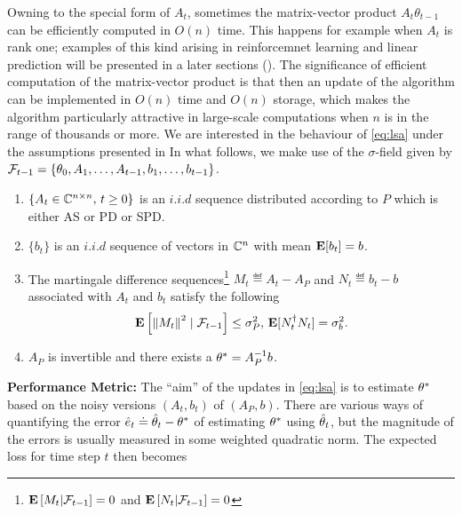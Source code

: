 \documentclass{article}
\begin{document}
Owning to the special form of $A_t$, sometimes the matrix-vector product $A_t \theta_{t-1}$
can be efficiently computed in $O(n)$ time.
This happens for example when $A_t$ is rank one; examples of this kind arising in reinforcemnet learning \cite{} and linear prediction \cite{} will be presented in a later sections (). The significance of efficient computation of the matrix-vector product is that then an update of the algorithm
can be implemented in $O(n)$ time and $O(n)$ storage, which makes the algorithm particularly attractive in large-scale computations when $n$ is in the range of thousands or more.
We are interested in the behaviour of \eqref{eq:lsa} under the assumptions presented in  In what follows, we make use of the $\sigma$-field given by $\mathcal{F}_{t-1}=\{\theta_0,A_1,\ldots, A_{t-1}, b_1,\ldots, b_{t-1}\}$.
\begin{assumption}\label{assmp:lsa}
\begin{enumerate}[leftmargin=*, before = \leavevmode\vspace{-\baselineskip}]
\item \label{dist} $\{A_t\in\mathbb{C}^{n\times n},\, t\geq 0\}$ is an $i.i.d$ sequence distributed according to $P$ which is either AS or PD or SPD.
\item $\{b_t\}$ is an $i.i.d$ sequence of vectors in $\mathbb{C}^n$ with mean $\mathbf{E}[b_t]=b$.
\item \label{matvar} The martingale difference sequences\footnote{$\mathbf{E}\left[M_t|\mathcal{F}_{t-1}\right]=0$ and $\mathbf{E}\left[N_t|\mathcal{F}_{t-1}\right]=0$} $M_t\eqdef A_t-A_P$ and $N_t\eqdef b_t-b$ associated with $A_t$ and $b_t$ satisfy the following
\begin{align*}\mathbf{E}\left[ \left\| M_t\right\|^2\mid\mathcal{F}_{t-1}\right]\leq \sigma^2_P, \, \mathbf{E}[N_t^\dag N_t]=\sigma_b^2.\end{align*}
\item $A_P$ is invertible and there exists a $\theta^*=A_P^{-1}b$.
\end{enumerate}
\end{assumption}
\textbf{Performance Metric:}
The ``aim'' of the updates in \eqref{eq:lsa} is to estimate $\theta^*$ based on the noisy versions $(A_t,b_t)$ of $(A_P,b)$.
There are various ways of quantifying the error $\hat{e}_t \doteq \hat{\theta}_t- \theta^*$ of estimating $\theta^*$ using $\hat{\theta}_t$, but the magnitude
of the errors is usually measured in some weighted quadratic norm. The expected loss for time step $t$ then becomes
\end{document}
